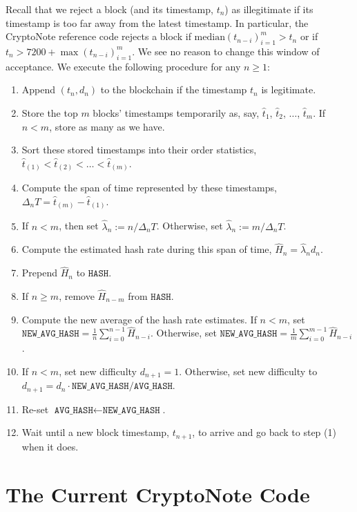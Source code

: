 \documentclass[12pt,english]{mrl}
\theoremstyle{definition}
\renewcommand{\geq}{\geqslant}
\numberwithin{equation}{section}
\numberwithin{figure}{section}
\numberwithin{equation}{section}
\numberwithin{equation}{section}
\numberwithin{figure}{section}
\begin{document}
Recall that we reject a block (and its timestamp, $t_n$) as illegitimate if its timestamp is too far away from the latest timestamp. In particular, the CryptoNote reference code rejects a block if $\text{median}(t_{n-i})_{i=1}^{m} > t_n$ or if $t_n > 7200 + \max(t_{n-i})_{i=1}^{m}$. We see no reason to change this window of acceptance.  We execute the following procedure for any $n \geq 1$:
\begin{enumerate}[(1)]
\item Append $(t_n, d_n)$ to the blockchain if the timestamp $t_n$ is legitimate.
\item Store the top $m$ blocks' timestamps temporarily as, say, $\hat{t}_1$, $\hat{t}_2$, $\ldots$, $\hat{t}_{m}$. If $n < m$, store as many as we have.
\item Sort these stored timestamps into their order statistics, $\hat{t}_{(1)} < \hat{t}_{(2)} < \ldots < \hat{t}_{(m)}$.
\item Compute the span of time represented by these timestamps, $\Delta_{n} T = \hat{t}_{(m)} - \hat{t}_{(1)}$. 
\item If $n < m$, then set $\hat{\lambda}_{n} := n/\Delta_n T$. Otherwise, set $\hat{\lambda}_{n} := m/\Delta_n T$.
\item Compute the estimated hash rate during this span of time, $\hat{H}_{n} = \hat{\lambda}_{n} d_{n}$. 
\item Prepend $\hat{H}_n$ to $\texttt{HASH}$.
\item If $n \geq m$, remove $\hat{H}_{n-m}$ from $\texttt{HASH}$.
\item Compute the new average of the hash rate estimates. If $n < m$, set $\texttt{NEW\_AVG\_HASH} = \frac{1}{n} \sum_{i=0}^{n-1} \hat{H}_{n-i}$. Otherwise, set $\texttt{NEW\_AVG\_HASH} = \frac{1}{m} \sum_{i=0}^{m-1} \hat{H}_{n-i}$.
\item If $n < m$, set new difficulty $d_{n+1} = 1$. Otherwise, set new difficulty to $d_{n+1} = d_{n} \cdot \texttt{NEW\_AVG\_HASH}/\texttt{AVG\_HASH}$.
\item Re-set $\texttt{AVG\_HASH} \leftarrow \texttt{NEW\_AVG\_HASH}$. 
\item Wait until a new block timestamp, $t_{n+1}$, to arrive and go back to step (1) when it does.
\end{enumerate}


\section{The Current CryptoNote Code}\label{refCode}
\end{document}
